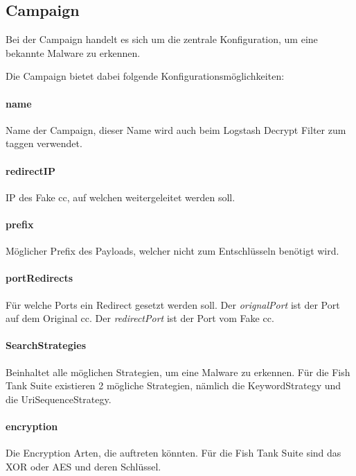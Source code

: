 \subsection{Campaign}
Bei der Campaign handelt es sich um die zentrale Konfiguration, um eine bekannte Malware zu erkennen.

Die Campaign bietet dabei folgende Konfigurationsmöglichkeiten:



\paragraph{name} Name der Campaign, dieser Name wird auch beim Logstash Decrypt Filter zum taggen verwendet.

\paragraph{redirectIP} IP des Fake \gls{cc}, auf welchen weitergeleitet werden soll.

\paragraph{prefix} Möglicher Prefix des Payloads, welcher nicht zum Entschlüsseln benötigt wird.

\paragraph{portRedirects} Für welche Ports ein Redirect gesetzt werden soll. Der \textit{orignalPort} ist der Port auf dem Original \gls{cc}. Der \textit{redirectPort} ist der Port vom Fake \gls{cc}.

\paragraph{SearchStrategies} Beinhaltet alle möglichen Strategien, um eine Malware zu erkennen. Für die Fish Tank Suite existieren 2 mögliche Strategien, nämlich die KeywordStrategy und die UriSequenceStrategy.

\paragraph{encryption} Die Encryption Arten, die auftreten könnten. Für die Fish Tank Suite sind das XOR oder AES und deren Schlüssel.

